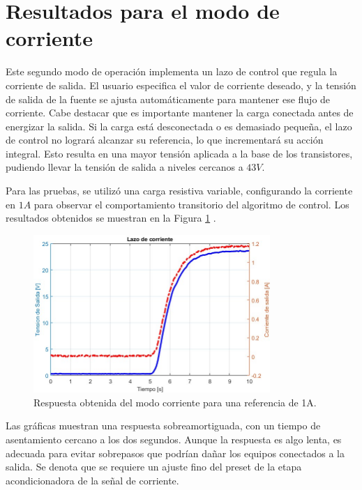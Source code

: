 \section{Resultados para el modo de corriente} \label{S:subseccion de corriente}
Este segundo modo de operación implementa un lazo de control que regula la corriente de salida. El usuario especifica el valor de corriente deseado, y la tensión de salida de la fuente se ajusta automáticamente para mantener ese flujo de corriente. Cabe destacar que es importante mantener la carga conectada antes de energizar la salida. Si la carga está desconectada o es demasiado pequeña, el lazo de control no logrará alcanzar su referencia, lo que incrementará su acción integral. Esto resulta en una mayor tensión aplicada a la base de los transistores, pudiendo llevar la tensión de salida a niveles cercanos a $43V$. \par 
Para las pruebas, se utilizó una carga resistiva variable, configurando la corriente en $1A$ para observar el comportamiento transitorio del algoritmo de control. Los resultados obtenidos se muestran en la Figura \ref{F:Lcorriente1} .
\begin{figure}[htbp]
    \centering
    \includegraphics[width=0.8\textwidth]{./imagenes/LazoCorriente.jpg}
    \caption{Respuesta obtenida del modo corriente para una referencia de 1A.}
    \label{F:Lcorriente1}
\end{figure} \par 
Las gráficas muestran una respuesta sobreamortiguada, con un tiempo de asentamiento cercano a los dos segundos. Aunque la respuesta es algo lenta, es adecuada para evitar sobrepasos que podrían dañar los equipos conectados a la salida. Se denota que se requiere un ajuste fino del preset de la etapa acondicionadora de la señal de corriente. \par

